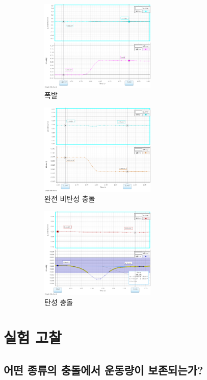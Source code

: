 \documentclass[12pt,a4paper]{article}
\begin{document}
\begin{figure}[!h]
    \centering
    \begin{subfigure}[]{0.3\textwidth}
        \includegraphics[height=4.36cm]{W10_exp.png}
        \caption{\label{fig4-A}폭발}
    \end{subfigure}
    \begin{subfigure}[]{0.3\textwidth}
        \includegraphics[height=4.36cm]{W10_tnelastic.png}
        \caption{\label{fig4-B}완전 비탄성 충돌}
    \end{subfigure}
    \begin{subfigure}[]{0.3\textwidth}
        \includegraphics[height=4.36cm]{W10_elastic.png}
        \caption{\label{fig4-C}탄성 충돌}
    \end{subfigure}
    \caption{\label{fig4}}
\end{figure}
\clearpage
\section{실험 고찰}
\subsection{어떤 종류의 충돌에서 운동량이 보존되는가?}
\end{document}
